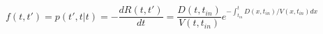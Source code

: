 \begin{equation}
f(t,t') = p(t',t|t)= -\frac{dR(t,t')}{dt} = \frac{D(t,t_{in})}{V(t,t_{in})}e^{-\int_{t_{in}}^t D(x,t_{in})/V(x,t_{in}) dx}
\end{equation}
